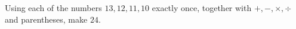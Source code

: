 Using each of the numbers $13,12,11,10$ exactly once, together with $+,-,\times,\div$ and parentheses, make $24$.

